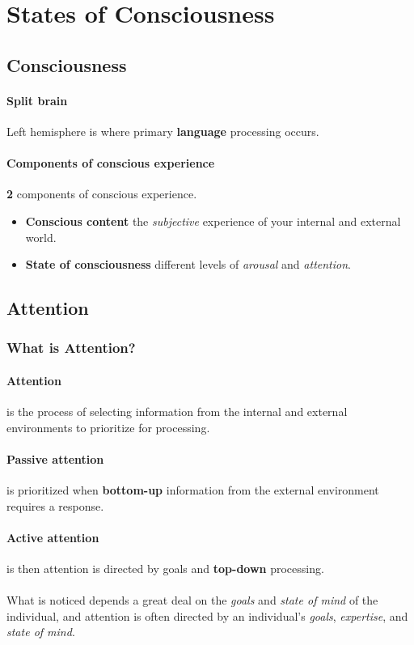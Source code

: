\documentclass{article}
\begin{document}
	\section{States of Consciousness}
	\subsection{Consciousness}
	\paragraph{Split brain} Left hemisphere is where primary \textbf{language} processing occurs.
	\paragraph{Components of conscious experience}\textbf{2} components of conscious experience.
	\begin{itemize}
		\item \textbf{Conscious content} the \emph{subjective} experience of your internal and external world.
		\item \textbf{State of consciousness} different levels of \emph{arousal} and \emph{attention}.
	\end{itemize}
	\subsection{Attention}
	\subsubsection{What is Attention?}
	\paragraph{Attention} is the process of selecting information from the internal and external environments to prioritize for processing.
	\paragraph{Passive attention} is prioritized when \textbf{bottom-up} information from the external environment requires a response.
	\paragraph{Active attention} is then attention is directed by goals and \textbf{top-down} processing.
	\paragraph{} What is noticed depends a great deal on the \emph{goals} and \emph{state of mind} of the individual, and attention is often directed by an individual's \emph{goals}, \emph{expertise}, and \emph{state of mind}.
\end{document}
